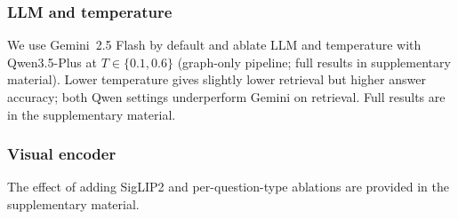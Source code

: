 

\subsubsection{LLM and temperature}
We use Gemini~2.5 Flash by default and ablate LLM and temperature with Qwen3.5-Plus at $T \in \{0.1, 0.6\}$ (graph-only pipeline; full results in supplementary material).
Lower temperature gives slightly lower retrieval but higher answer accuracy; both Qwen settings underperform Gemini on retrieval. Full results are in the supplementary material.

\subsubsection{Visual encoder}
The effect of adding SigLIP2 \cite{tschannen2025siglip} and per-question-type ablations are provided in the supplementary material.


